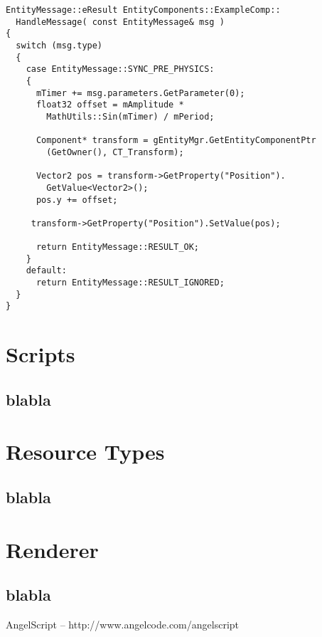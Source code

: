 \documentclass[a4paper, 12pt]{report}
\begin{document}
\begin{verbatim}
EntityMessage::eResult EntityComponents::ExampleComp::
  HandleMessage( const EntityMessage& msg )
{
  switch (msg.type)
  {
    case EntityMessage::SYNC_PRE_PHYSICS:
    {
      mTimer += msg.parameters.GetParameter(0);
      float32 offset = mAmplitude * 
        MathUtils::Sin(mTimer) / mPeriod;

      Component* transform = gEntityMgr.GetEntityComponentPtr
        (GetOwner(), CT_Transform);

      Vector2 pos = transform->GetProperty("Position").
        GetValue<Vector2>();
      pos.y += offset;

     transform->GetProperty("Position").SetValue(pos);

      return EntityMessage::RESULT_OK;
    }
    default:
      return EntityMessage::RESULT_IGNORED;
  }
}
\end{verbatim}

\chapter{Scripts}

\section{blabla}

\chapter{Resource Types}

\section{blabla}

\chapter{Renderer}

\section{blabla}


\begin{thebibliography}{9}
AngelScript -- http://www.angelcode.com/angelscript

\end{thebibliography}

\clearpage
{}
\listoffigures

\clearpage
{}
\listoftables
\end{document}
